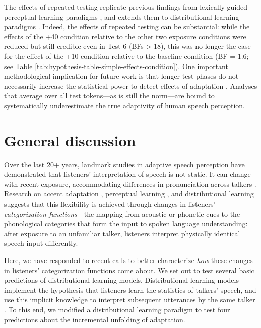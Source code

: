 \documentclass[
  11pt,
  man,mask,floatsintext]{apa6}
\begin{document}
The effects of repeated testing replicate previous findings from lexically-guided perceptual learning paradigms \autocite{scharenborg-janse2013,giovannone-theodore2021,cummings-theodore2023,liu-jaeger2018,liu-jaeger2019,reinisch-holt2014,zheng-samuel2023}, and extends them to distributional learning paradigms \autocites[see also][]{colby2018,kleinschmidt2020}. Indeed, the effects of repeated testing can be substantial: while the effects of the +40 condition relative to the other two exposure conditions were reduced but still credible even in Test 6 (BFs \textgreater{} 18), this was no longer the case for the effect of the +10 condition relative to the baseline condition (BF = 1.6; see Table \ref{tab:hypothesis-table-simple-effects-condition}). One important methodological implication for future work is that longer test phases do not necessarily increase the statistical power to detect effects of adaptation \autocite[unless analyses account for the effects of repeated testing, as done in, e.g.,][]{liu-jaeger2018}. Analyses that average over all test tokens---as is still the norm---are bound to systematically underestimate the true adaptivity of human speech perception.

\section{General discussion}\label{general-discussion}

Over the last 20+ years, landmark studies in adaptive speech perception have demonstrated that listeners' interpretation of speech is not static. It can change with recent exposure, accommodating differences in pronunciation across talkers \autocites[for reviews, see][]{bent-baeseberk2021,schertz-clare2020}. Research on accent adaptation \autocites[AA,][]{eisner2013,schertz2016,xie2017}, perceptual learning \autocites[VGPL/LGPL,][]{eisner-mcqueen2005,kraljic-samuel2006,kurumada2018,norris2003,reinisch-holt2014,vroomen2007}, and distributional learning \autocites[DL,][]{bejjanki2011,idemaru-holt2020,kleinschmidt2020,nixon2016,theodore-monto2019} suggests that this flexibility is achieved through changes in listeners' \emph{categorization functions}---the mapping from acoustic or phonetic cues to the phonological categories that form the input to spoken language understanding: after exposure to an unfamiliar talker, listeners interpret physically identical speech input differently.

Here, we have responded to recent calls to better characterize \emph{how} these changes in listeners' categorization functions come about. We set out to test several basic predictions of distributional learning models. Distributional learning models implement the hypothesis that listeners learn the statistics of talkers' speech, and use this implicit knowledge to interpret subsequent utterances by the same talker \autocite{clayards2008,idemaru-holt2011,kleinschmidt-jaeger2015,mcmurray-jongman2011}. To this end, we modified a distributional learning paradigm to test four predictions about the incremental unfolding of adaptation.
\end{document}
